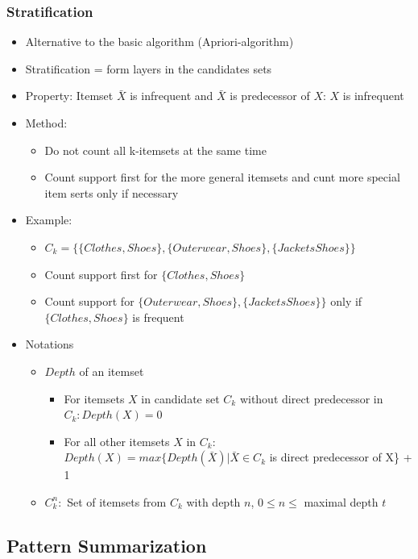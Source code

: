 \documentclass{article}
\begin{document}
\subsubsection{Stratification}
\begin{itemize}
  \item Alternative to the basic algorithm (Apriori-algorithm)
  \item Stratification = form layers in the candidates sets
  \item Property: Itemset $\bar{X}$ is infrequent and $\bar{X}$ is predecessor of $X$: $X$ is infrequent
  \item Method:
    \begin{itemize}
      \item Do not count all k-itemsets at the same time
      \item Count support first for the more general itemsets and cunt more special item serts only if necessary
    \end{itemize}
  \item Example:
   \begin{itemize}
      \item $C_k = \{\{Clothes, Shoes\}, \{Outerwear, Shoes\}, \{Jackets Shoes\}\}$
      \item Count support first for $\{Clothes, Shoes\}$
      \item Count support for $\{Outerwear, Shoes\}, \{Jackets Shoes\}\}$ only if $\{Clothes, Shoes\}$ is frequent
    \end{itemize} 
  \item Notations
    \begin{itemize}
      \item $Depth$ of an itemset
        \begin{itemize}
          \item For itemsets $X$ in candidate set $C_k$ without direct predecessor in $C_k: Depth(X) = 0$
          \item For all other itemsets $X$ in $C_k$: \\ $Depth(X) = max\{Depth(\bar{X}) | \bar{X} \in C_k $ is direct predecessor of X\} + 1
        \end{itemize}
      \item $C_k^n:$ Set of itemsets from $C_k$ with depth $n$, $0 \le n \le$ maximal depth $t$
    \end{itemize} 
\end{itemize}

\newpage

\subsection{Pattern Summarization}
\end{document}

